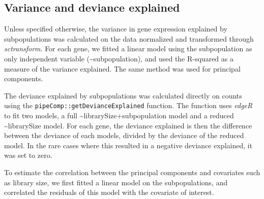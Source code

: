 \documentclass{bmcart}
\begin{document}
\subsection*{Variance and deviance explained}

Unless specified otherwise, the variance in gene expression explained by subpopulations was calculated on the data normalized and transformed through \textit{sctransform}. For each gene, we fitted a linear model using the subpopulation as only independent variable (\textasciitilde subpopulation), and used the R-squared as a measure of the variance explained. The same method was used for principal components.

The deviance explained by subpopulations was calculated directly on counts using the \texttt{pipeComp::getDevianceExplained} function. The function uses \textit{edgeR} to fit two models, a full \textasciitilde librarySize+subpopulation model and a reduced \textasciitilde librarySize model. For each gene, the deviance explained is then the difference between the deviance of each models, divided by the deviance of the reduced model. In the rare cases where this resulted in a negative deviance explained, it was set to zero.

To estimate the correlation between the principal components and covariates such as library size, we first fitted a linear model on the subpopulations, and correlated the residuals of this model with the covariate of interest.


\end{document}
